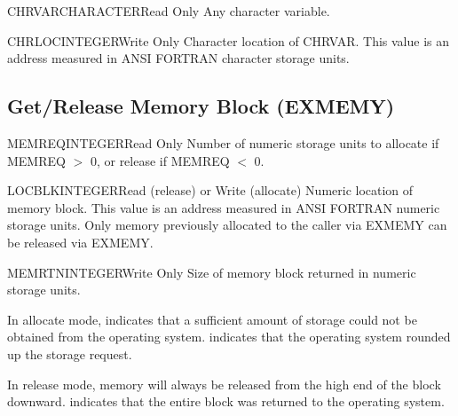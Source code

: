 
\begin{argy}{CHRVAR}{CHARACTER}{Read Only}
Any character variable.
\end{argy}

\begin{argy}{CHRLOC}{INTEGER}{Write Only}
Character location of CHRVAR.  This value is an address measured in ANSI
FORTRAN character storage units.
\end{argy}


\subsection{Get/Release Memory Block (EXMEMY)} \label{sec:exmemy}


\begin{argy}{MEMREQ}{INTEGER}{Read Only}
Number of numeric storage units to allocate if MEMREQ $>$ 0, or release if
MEMREQ $<$ 0.
\end{argy}

\begin{argy}{LOCBLK}{INTEGER}{Read (release) or Write (allocate)}
Numeric location of memory block.  This value is an address measured in ANSI
FORTRAN numeric storage units. Only memory previously allocated to the
caller via EXMEMY can be released via EXMEMY.
\end{argy}

\begin{argy}{MEMRTN}{INTEGER}{Write Only}
Size of memory block returned in numeric storage units.
\end{argy}

In allocate mode,  indicates that a sufficient amount of
storage could not be obtained from the operating system.  
indicates that the operating system rounded up the storage request.

In release mode, memory will always be released from the high end of the
block downward.   indicates that the entire block was returned to
the operating system.


